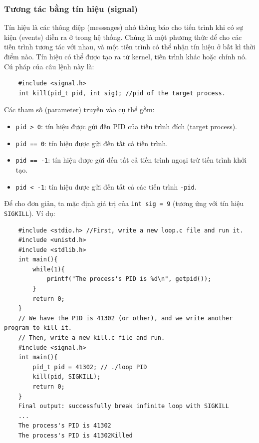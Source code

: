 \documentclass{article}
\begin{document}
\subsubsection{Tương tác bằng tín hiệu (signal)}
Tín hiệu là các thông điệp (messsages) nhỏ thông báo cho tiến trình khi có sự kiện (events) diễn ra ở trong hệ thống. Chúng là một phương thức
để cho các tiến trình tương tác với nhau, và một tiến trình có thể nhận tín hiệu ở bất kì thời điểm nào. Tín hiệu có thể được tạo ra từ kernel, tiến trình khác hoặc chính nó. Cú pháp của câu lệnh này là:
\begin{verbatim}
    #include <signal.h>
    int kill(pid_t pid, int sig); //pid of the target process.
\end{verbatim}
Các tham số (parameter) truyền vào cụ thể gồm:
\begin{itemize}
    \item \verb|pid > 0|: tín hiệu được gửi đến PID của tiến trình đích (target process).
    \item \verb|pid == 0|: tín hiệu được gửi đến tất cả tiến trình.
    \item \verb|pid == -1|: tín hiệu được gửi đến tất cả tiến trình ngoại trừ tiến trình khởi tạo.
    \item \verb|pid < -1|: tín hiệu được gửi đến tất cả các tiến trình \verb|-pid|.
\end{itemize}
Để cho đơn giản, ta mặc định giá trị của \verb|int sig = 9| (tương ứng với tín hiệu \verb|SIGKILL|). Ví dụ:
\begin{verbatim}
    #include <stdio.h> //First, write a new loop.c file and run it.
    #include <unistd.h>
    #include <stdlib.h>
    int main(){
        while(1){
            printf("The process's PID is %d\n", getpid());
        }
        return 0;
    }
    // We have the PID is 41302 (or other), and we write another program to kill it.
    // Then, write a new kill.c file and run.
    #include <signal.h>
    int main(){
        pid_t pid = 41302; // ./loop PID
        kill(pid, SIGKILL);
        return 0;
    }
    Final output: successfully break infinite loop with SIGKILL
    ...
    The process's PID is 41302
    The process's PID is 41302Killed    
\end{verbatim}
\end{document}

